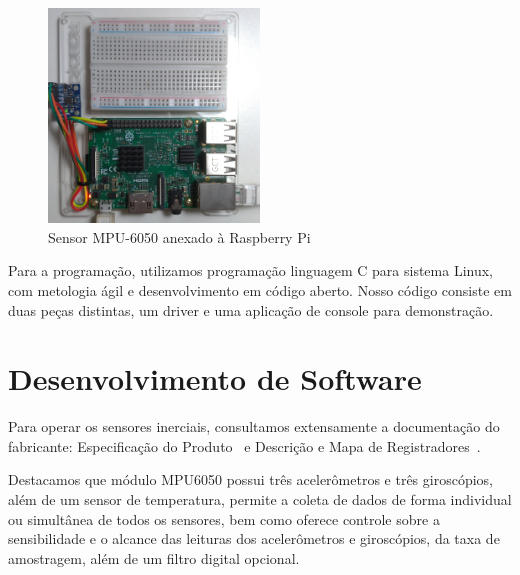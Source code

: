 \begin{figure}[H]
    \centering
    \caption{Sensor MPU-6050 anexado à Raspberry Pi}\label{fig:mpu6050-proto-top}
    \includegraphics[width=0.5\textwidth]{figuras/mpu6050-proto-top.jpg}
\end{figure}

Para a programação, utilizamos programação linguagem C para sistema Linux, com metologia ágil e desenvolvimento em código aberto. Nosso código consiste em duas peças distintas, um driver e uma aplicação de console para demonstração.

\section{Desenvolvimento de Software}

Para operar os sensores inerciais, consultamos extensamente a documentação do fabricante: Especificação do Produto~\cite{mpu6050ps} e Descrição e Mapa de Registradores~\cite{mpu6050rm}.

Destacamos que módulo MPU6050 possui três acelerômetros e três giroscópios, além de um sensor de temperatura, permite a coleta de dados de forma individual ou simultânea de todos os sensores, bem como oferece controle sobre a sensibilidade e o alcance das leituras dos acelerômetros e giroscópios, da taxa de amostragem, além de um filtro digital opcional.

